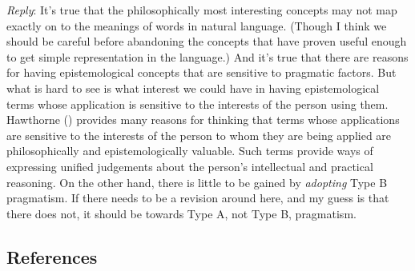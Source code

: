 \documentclass[
  11pt,
  letterpaper,
  DIV=11,
  numbers=noendperiod,
  twoside]{scrartcl}
\begin{document}
\emph{Reply}: It's true that the philosophically most interesting
concepts may not map exactly on to the meanings of words in natural
language. (Though I think we should be careful before abandoning the
concepts that have proven useful enough to get simple representation in
the language.) And it's true that there are reasons for having
epistemological concepts that are sensitive to pragmatic factors. But
what is hard to see is what interest we could have in having
epistemological terms whose application is sensitive to the interests of
the person using them. Hawthorne ()
provides many reasons for thinking that terms whose applications are
sensitive to the interests of the person to whom they are being applied
are philosophically and epistemologically valuable. Such terms provide
ways of expressing unified judgements about the person's intellectual
and practical reasoning. On the other hand, there is little to be gained
by \emph{adopting} Type B pragmatism. If there needs to be a revision
around here, and my guess is that there does not, it should be towards
Type A, not Type B, pragmatism.

\subsection*{References}\label{references}
\end{document}
